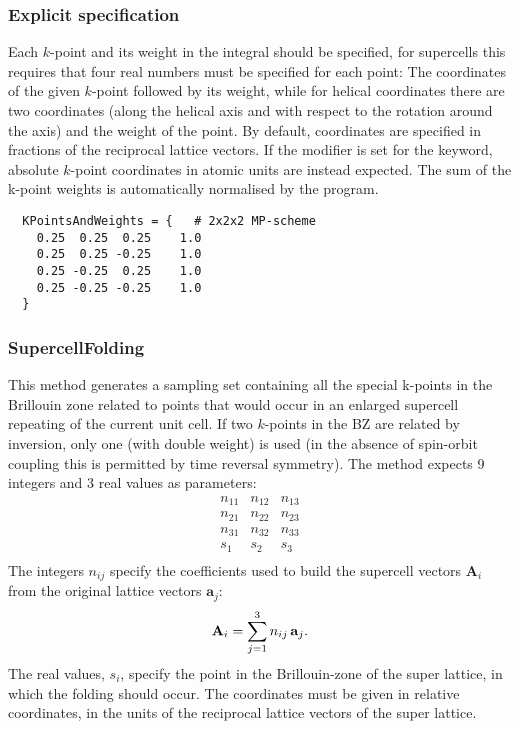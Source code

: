 \subsubsection{Explicit specification}

Each $k$-point and its weight in the integral should be specified, for
supercells this requires that four real numbers must be specified for
each point: The coordinates of the given $k$-point followed by its
weight, while for helical coordinates there are two coordinates (along
the helical axis and with respect to the rotation around the axis) and
the weight of the point. By default, coordinates are specified in
fractions of the reciprocal lattice vectors. If the modifier
 is set for the  keyword, absolute
$k$-point coordinates in atomic units are instead expected.  The sum
of the k-point weights is automatically normalised by the program.
\begin{verbatim}
  KPointsAndWeights = {   # 2x2x2 MP-scheme
    0.25  0.25  0.25    1.0
    0.25  0.25 -0.25    1.0
    0.25 -0.25  0.25    1.0
    0.25 -0.25 -0.25    1.0
  }
\end{verbatim}

\subsubsection{SupercellFolding\cb}
\label{sec:dftbp.SupercellFolding}

This method generates a sampling set containing all the special
k-points in the Brillouin zone related to points that would occur in
an enlarged supercell repeating of the current unit cell.  If two
$k$-points in the BZ are related by inversion, only one (with double
weight) is used (in the absence of spin-orbit coupling this is
permitted by time reversal symmetry). The 
method expects 9 integers and 3 real values as parameters:
\begin{equation*}
  \begin{array}{ccc}
    n_{11} & n_{12} & n_{13} \\
    n_{21} & n_{22} & n_{23} \\
    n_{31} & n_{32} & n_{33} \\
    s_{1} & s_{2}   & s_{3} \\
  \end{array}
\end{equation*}
The integers $n_{ij}$ specify the coefficients used to build the
supercell vectors $\mathbf{A}_i$ from the original lattice vectors
$\mathbf{a}_j$:
\begin{equation*}
  \mathbf{A}_i = \sum_{j=1}^3 n_{ij}\, \mathbf{a}_j
  \text.
\end{equation*}
The real values, $s_i$, specify the point in the Brillouin-zone of the
super lattice, in which the folding should occur. The coordinates must
be given in relative coordinates, in the units of the reciprocal
lattice vectors of the super lattice.

